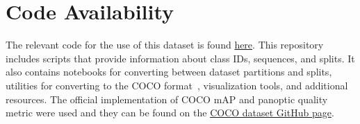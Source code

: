 \section{Code Availability}
The relevant code for the use of this dataset is found \href{https://github.com/labdeeman7/cholec_instance_seg}{here}. This repository includes scripts that provide information about class IDs, sequences, and splits. It also contains notebooks for converting between dataset partitions and splits, utilities for converting to the COCO format~\cite{lin2014microsoft}, visualization tools,  and additional resources. The official implementation of COCO mAP and panoptic quality metric were used and they can be found on the \href{https://github.com/orgs/cocodataset/repositories}{COCO dataset GitHub page}.




